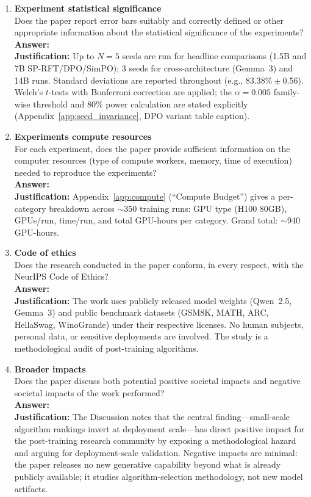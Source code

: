 \documentclass{article}
\newcommand{\sprft}{SP-RFT}
\begin{document}
\begin{enumerate}
\item {\bf Experiment statistical significance}\\
Does the paper report error bars suitably and correctly defined or other appropriate information about the statistical significance of the experiments?\\
\textbf{Answer:} \answerYes{}\\
\textbf{Justification:} Up to $N=5$ seeds are run for headline comparisons (1.5B and 7B \sprft{}/DPO/SimPO); 3 seeds for cross-architecture (Gemma~3) and 14B runs. Standard deviations are reported throughout (e.g., $83.38\% \pm 0.56$). Welch's $t$-tests with Bonferroni correction are applied; the $\alpha=0.005$ family-wise threshold and 80\% power calculation are stated explicitly (Appendix~\ref{app:seed_invariance}, DPO variant table caption).

\item {\bf Experiments compute resources}\\
For each experiment, does the paper provide sufficient information on the computer resources (type of compute workers, memory, time of execution) needed to reproduce the experiments?\\
\textbf{Answer:} \answerYes{}\\
\textbf{Justification:} Appendix~\ref{app:compute} (``Compute Budget'') gives a per-category breakdown across $\sim$350 training runs: GPU type (H100 80GB), GPUs/run, time/run, and total GPU-hours per category. Grand total: $\sim$940 GPU-hours.

\item {\bf Code of ethics}\\
Does the research conducted in the paper conform, in every respect, with the NeurIPS Code of Ethics?\\
\textbf{Answer:} \answerYes{}\\
\textbf{Justification:} The work uses publicly released model weights (Qwen~2.5, Gemma~3) and public benchmark datasets (GSM8K, MATH, ARC, HellaSwag, WinoGrande) under their respective licenses. No human subjects, personal data, or sensitive deployments are involved. The study is a methodological audit of post-training algorithms.

\item {\bf Broader impacts}\\
Does the paper discuss both potential positive societal impacts and negative societal impacts of the work performed?\\
\textbf{Answer:} \answerYes{}\\
\textbf{Justification:} The Discussion notes that the central finding---small-scale algorithm rankings invert at deployment scale---has direct positive impact for the post-training research community by exposing a methodological hazard and arguing for deployment-scale validation. Negative impacts are minimal: the paper releases no new generative capability beyond what is already publicly available; it studies algorithm-selection methodology, not new model artifacts.


\end{enumerate}
\end{document}
